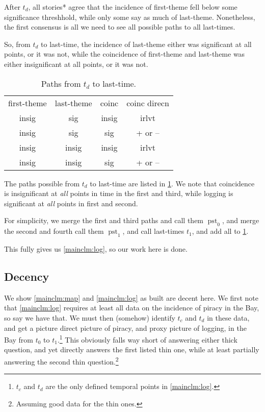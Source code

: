 \documentclass{amsart}
\DeclareMathOperator{\pst}{pst}%
\theoremstyle{definition}
\theoremstyle{remark}
\begin{document}
			After \(t_d\), all stories* agree that the incidence of first-theme fell below some significance threshhold, while only some say as much of last-theme. Nonetheless, the first consensus is all we need to see all possible paths to all last-times.
			
			So, from \(t_d\) to last-time, the incidence of last-theme either was significant at all points, or it was not, while the coincidence of first-theme and last-theme was either insignificant at all points, or it was not.
			\begin{table}
			\caption{Paths from \(t_d\) to last-time.}
			\label{tab:pathsforlog}
			\begin{tabular}{cccc}
			first-theme &last-theme &coinc &coinc direcn\\
			insig	&sig	&insig	&irlvt\\
			insig	&sig	&sig		&+ or --\\
			insig	&insig	&insig	&irlvt\\
			insig	&insig	&sig		&+ or --
			\end{tabular}
			\end{table}
			
			The paths possible from \(t_d\) to last-time are listed in \ref{tab:pathsforlog}. We note that coincidence is insignificant at \emph{all} points in time in the first and third, while logging is significant at \emph{all} points in first and second.
			
			For simplicity, we merge the first and third paths and call them \(\pst_0\), and merge the second and fourth call them \(\pst_1\), and call last-times \(t_1\), and add all to \ref{tab:pathsforlog}. 
			
			This fully gives us \ref{mainclm:log}, so our work here is done.
	\subsection{Decency}
		\label{ss:decency}
		We show \ref{mainclm:map} and \ref{mainclm:log} as built are decent here. We first note that \ref{mainclm:log} requires at least all data on the incidence of piracy in the Bay, so say we have that. We must then (somehow) identify \(t_c\) and \(t_d\) in these data, and get a picture direct picture of piracy, and proxy picture of logging, in the Bay from \(t_0\) to \(t_1\).\footnote{\(t_c\) and \(t_d\) are the only defined temporal points in \ref{mainclm:log}.} This obviously falls way short of answering either thick question, and yet directly answers the first listed thin one, while at least partially answering the second thin question.\footnote{Assuming good data for the thin ones.}
		
\end{document}
